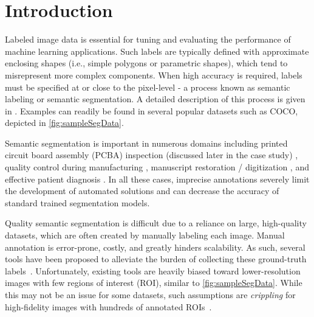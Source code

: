 \section{Introduction}
Labeled image data is essential for tuning and evaluating the performance of machine learning applications.
Such labels are typically defined with approximate enclosing shapes (i.e., simple polygons or parametric shapes), which tend to misrepresent more complex components.
When high accuracy is required, labels must be specified at or close to the pixel-level - a process known as semantic labeling or semantic segmentation.
A detailed description of this process is given in \cite{chengSurveyAnalysisAutomatic2018}.
Examples can readily be found in several popular datasets such as COCO, depicted in \autoref{fig:sampleSegData}.

\makeSampleSegFig

Semantic segmentation is important in numerous domains including printed circuit board assembly (PCBA) inspection (discussed later in the case study) \cite{paradis2020color,azhaganReviewAutomaticBill2019}, quality control during manufacturing \cite{fergusonDetectionSegmentationManufacturing2018,anagnostopoulosComputerVisionApproach2001,anagnostopoulosHighPerformanceComputing2002}, manuscript restoration / digitization \cite{gatosSegmentationfreeRecognitionTechnique2004,kesimanNewSchemeText2016,jainTextSegmentationUsing1992,taxtSegmentationDocumentImages1989,fujisawaSegmentationMethodsCharacter1992}, and effective patient diagnosis \cite{seifertSemanticAnnotationMedical2010,rajchlDeepCutObjectSegmentation2017,yushkevichUserguided3DActive2006,iakovidisRatsnakeVersatileImage2014}.
In all these cases, imprecise annotations severely limit the development of automated solutions and can decrease the accuracy of standard trained segmentation models.

Quality semantic segmentation is difficult due to a reliance on large, high-quality datasets, which are often created by manually labeling each image.
Manual annotation is error-prone, costly, and greatly hinders scalability.
As such, several tools have been proposed to alleviate the burden of collecting these ground-truth labels~\cite{BestImageAnnotation}.
Unfortunately, existing tools are heavily biased toward lower-resolution images with few regions of interest (ROI), similar to \autoref{fig:sampleSegData}.
While this may not be an issue for some datasets, such assumptions are \emph{crippling} for high-fidelity images with hundreds of annotated ROIs~\cite{Ladicky_whatWhereCombiningCRFs,Wang_multiLabelImageAnnotation}.

